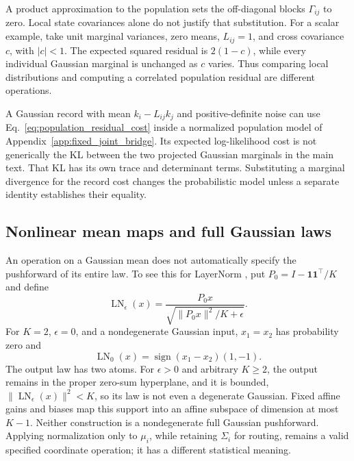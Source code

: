 \documentclass[twoside,11pt]{article}
\begin{document}
A product approximation to the population sets the off-diagonal blocks \(\Gamma_{ij}\) to zero. Local state covariances alone do not justify that substitution. For a scalar example, take unit marginal variances, zero means, \(L_{ij}=1\), and cross covariance \(c\), with \(|c|<1\). The expected squared residual is \(2(1-c)\), while every individual Gaussian marginal is unchanged as \(c\) varies. Thus comparing local distributions and computing a correlated population residual are different operations.

A Gaussian record with mean \(k_i-L_{ij}k_j\) and positive-definite noise can use Eq.~\eqref{eq:population_residual_cost} inside a normalized population model of Appendix~\ref{app:fixed_joint_bridge}. Its expected log-likelihood cost is not generically the KL between the two projected Gaussian marginals in the main text. That KL has its own trace and determinant terms. Substituting a marginal divergence for the record cost changes the probabilistic model unless a separate identity establishes their equality.

\subsection{Nonlinear mean maps and full Gaussian laws}
\label{sec:nonlinear_gaussian_scope}

An operation on a Gaussian mean does not automatically specify the pushforward of its entire law. To see this for LayerNorm \citep{ba2016layernorm}, put \(P_0=I-\mathbf1\mathbf1^\top/K\) and define
\begin{equation}
\operatorname{LN}_\epsilon(x)
=\frac{P_0x}{\sqrt{\|P_0x\|^2/K+\epsilon}}.
\label{eq:layernorm_gaussian_scope}
\end{equation}
For \(K=2\), \(\epsilon=0\), and a nondegenerate Gaussian input, \(x_1=x_2\) has probability zero and
\begin{equation}
\operatorname{LN}_0(x)
=\operatorname{sign}(x_1-x_2)(1,-1).
\label{eq:layernorm_two_atoms}
\end{equation}
The output law has two atoms. For \(\epsilon>0\) and arbitrary \(K\ge2\), the output remains in the proper zero-sum hyperplane, and it is bounded, \(\|\operatorname{LN}_\epsilon(x)\|^2<K\), so its law is not even a degenerate Gaussian. Fixed affine gains and biases map this support into an affine subspace of dimension at most \(K-1\). Neither construction is a nondegenerate full Gaussian pushforward. Applying normalization only to \(\mu_i\), while retaining \(\Sigma_i\) for routing, remains a valid specified coordinate operation; it has a different statistical meaning.
\end{document}
